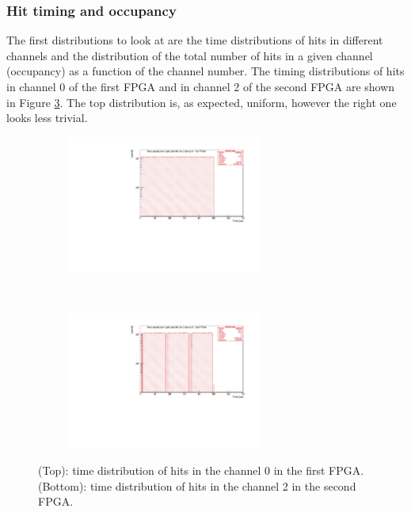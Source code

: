 \subsubsection{Hit timing and occupancy}\label{over}
The first distributions to look at are the time distributions of hits in 
different channels and the distribution of the total number of hits
in a given channel (occupancy) as a function of the channel number.
The timing distributions of hits in channel 0 of the first FPGA
and in channel 2 of the second FPGA are shown in Figure \ref{fig:1}.
The top distribution is, as expected, uniform, however the right one looks
less trivial.
\begin{figure}[!h]
  \begin{subfigure}[b]{\textwidth}
      \centering
      \includegraphics[width=0.7\textwidth]{figures/pdf/figure_00007_timedistr_roc_simulation_ch0_281.pdf}
      \label{fig:t1}
  \end{subfigure}
\\
  \begin{subfigure}[b]{\textwidth}
      \centering
      \includegraphics[width=0.7\textwidth]{figures/pdf/figure_00003_timedistr_roc_simulation_ch2_281.pdf}
      \label{fig:t2}
  \end{subfigure}
     \caption{(Top): time distribution of hits in the channel 0 in the first FPGA.
     (Bottom): time distribution of hits in the channel 2 in the second FPGA.}
     \label{fig:1}
\end{figure}
